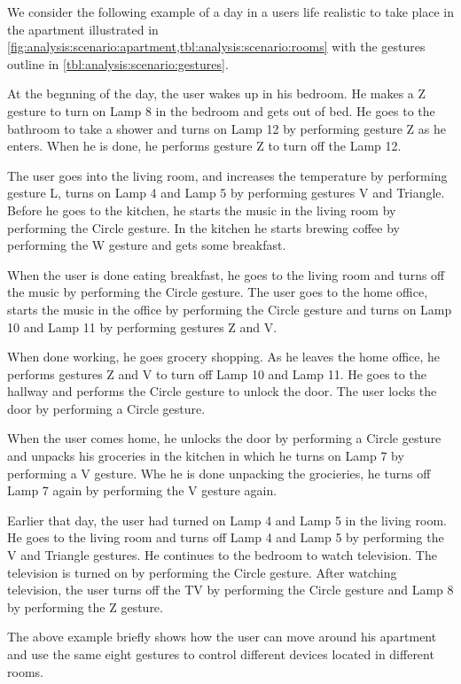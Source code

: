 We consider the following example of a day in a users life realistic to take place in the apartment illustrated in \cref{fig:analysis:scenario:apartment,tbl:analysis:scenario:rooms} with the gestures outline in \cref{tbl:analysis:scenario:gestures}.

\begin{testexample}
At the begnning of the day, the user wakes up in his bedroom. He makes a Z gesture to turn on Lamp 8 in the bedroom and gets out of bed. He goes to the bathroom to take a shower and turns on Lamp 12 by performing gesture Z as he enters. When he is done, he performs gesture Z to turn off the Lamp 12.

The user goes into the living room, and increases the temperature by performing gesture L, turns on Lamp 4 and Lamp 5 by performing gestures V and Triangle. Before he goes to the kitchen, he starts the music in the living room by performing the Circle gesture. In the kitchen he starts brewing coffee by performing the W gesture and gets some breakfast.

When the user is done eating breakfast, he goes to the living room and turns off the music by performing the Circle gesture. The user goes to the home office, starts the music in the office by performing the Circle gesture and turns on Lamp 10 and Lamp 11 by performing gestures Z and V.

When done working, he goes grocery shopping. As he leaves the home office, he performs gestures Z and V to turn off Lamp 10 and Lamp 11. He goes to the hallway and performs the Circle gesture to unlock the door. The user locks the door by performing a Circle gesture.

When the user comes home, he unlocks the door by performing a Circle gesture and unpacks his groceries in the kitchen in which he turns on Lamp 7 by performing a V gesture. Whe he is done unpacking the grocieries, he turns off Lamp 7 again by performing the V gesture again.

Earlier that day, the user had turned on Lamp 4 and Lamp 5 in the living room. He goes to the living room and turns off Lamp 4 and Lamp 5 by performing the V and Triangle gestures. He continues to the bedroom to watch television. The television is turned on by performing the Circle gesture. After watching television, the user turns off the TV by performing the Circle gesture and Lamp 8 by performing the Z gesture.
\end{testexample}

The above example briefly shows how the user can move around his apartment and use the same eight gestures to control different devices located in different rooms.


